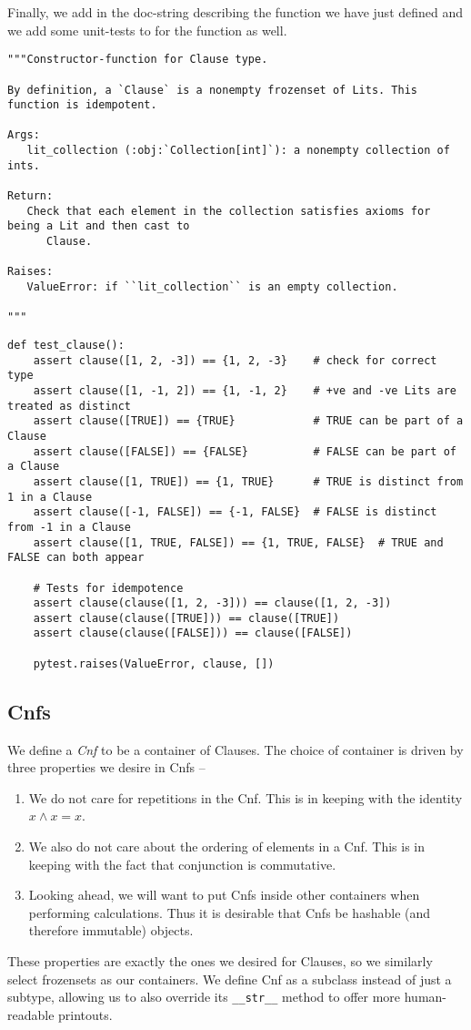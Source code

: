 \documentclass[11pt]{article}
\begin{document}
Finally, we add in the doc-string describing the function we have just defined
and we add some unit-tests to for the function as well.
\begin{verbatim}
"""Constructor-function for Clause type.

By definition, a `Clause` is a nonempty frozenset of Lits. This function is idempotent.

Args:
   lit_collection (:obj:`Collection[int]`): a nonempty collection of ints.

Return:
   Check that each element in the collection satisfies axioms for being a Lit and then cast to
      Clause.

Raises:
   ValueError: if ``lit_collection`` is an empty collection.

"""
\end{verbatim}


\begin{verbatim}
def test_clause():
    assert clause([1, 2, -3]) == {1, 2, -3}    # check for correct type
    assert clause([1, -1, 2]) == {1, -1, 2}    # +ve and -ve Lits are treated as distinct
    assert clause([TRUE]) == {TRUE}            # TRUE can be part of a Clause
    assert clause([FALSE]) == {FALSE}          # FALSE can be part of a Clause
    assert clause([1, TRUE]) == {1, TRUE}      # TRUE is distinct from 1 in a Clause
    assert clause([-1, FALSE]) == {-1, FALSE}  # FALSE is distinct from -1 in a Clause
    assert clause([1, TRUE, FALSE]) == {1, TRUE, FALSE}  # TRUE and FALSE can both appear

    # Tests for idempotence
    assert clause(clause([1, 2, -3])) == clause([1, 2, -3])
    assert clause(clause([TRUE])) == clause([TRUE])
    assert clause(clause([FALSE])) == clause([FALSE])

    pytest.raises(ValueError, clause, [])
\end{verbatim}

\subsection{Cnfs}
\label{sec:orgbb8fffd}
We define a \emph{Cnf} to be a container of Clauses.  The choice of container is
driven by three properties we desire in Cnfs --
\begin{enumerate}
\item We do not care for repetitions in the Cnf. This is in keeping with the
identity \(x\wedge x=x\).
\item We also do not care about the ordering of elements in a Cnf. This is in
keeping with the fact that conjunction is commutative.
\item Looking ahead, we will want to put Cnfs inside other containers when
performing calculations. Thus it is desirable that Cnfs be hashable (and
therefore immutable) objects.
\end{enumerate}
These properties are exactly the ones we desired for Clauses, so we
similarly select frozensets as our containers.  We define Cnf as a subclass
instead of just a subtype, allowing us to also override its \texttt{\_\_str\_\_}
method to offer more human-readable printouts.
\end{document}
